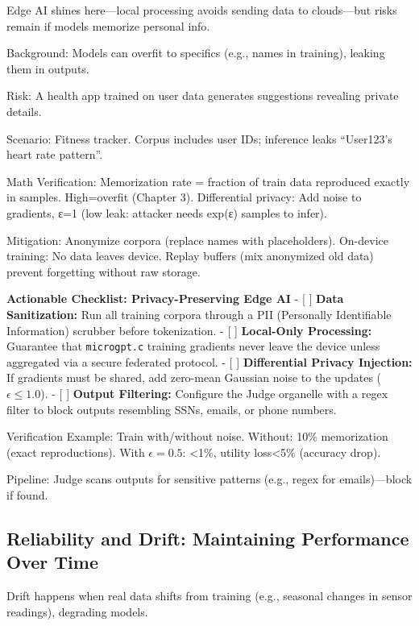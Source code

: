 \documentclass[
]{article}
\begin{document}
Edge AI shines here---local processing avoids sending data to
clouds---but risks remain if models memorize personal info.

Background: Models can overfit to specifics (e.g., names in training),
leaking them in outputs.

Risk: A health app trained on user data generates suggestions revealing
private details.

Scenario: Fitness tracker. Corpus includes user IDs; inference leaks
``User123's heart rate pattern''.

Math Verification: Memorization rate = fraction of train data reproduced
exactly in samples. High=overfit (Chapter 3). Differential privacy: Add
noise to gradients, ε=1 (low leak: attacker needs exp(ε) samples to
infer).

Mitigation: Anonymize corpora (replace names with placeholders).
On-device training: No data leaves device. Replay buffers (mix
anonymized old data) prevent forgetting without raw storage.

\textbf{Actionable Checklist: Privacy-Preserving Edge AI} - {[} {]}
\textbf{Data Sanitization:} Run all training corpora through a PII
(Personally Identifiable Information) scrubber before tokenization. -
{[} {]} \textbf{Local-Only Processing:} Guarantee that
\texttt{microgpt.c} training gradients never leave the device unless
aggregated via a secure federated protocol. - {[} {]}
\textbf{Differential Privacy Injection:} If gradients must be shared,
add zero-mean Gaussian noise to the updates (\(\epsilon \le 1.0\)). -
{[} {]} \textbf{Output Filtering:} Configure the Judge organelle with a
regex filter to block outputs resembling SSNs, emails, or phone numbers.

Verification Example: Train with/without noise. Without: 10\%
memorization (exact reproductions). With \(\epsilon=0.5\): \textless1\%,
utility loss\textless5\% (accuracy drop).

Pipeline: Judge scans outputs for sensitive patterns (e.g., regex for
emails)---block if found.

\subsection{Reliability and Drift: Maintaining Performance Over
Time}\label{reliability-and-drift-maintaining-performance-over-time}

Drift happens when real data shifts from training (e.g., seasonal
changes in sensor readings), degrading models.
\end{document}
